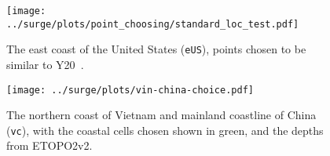 \begin{figure}[htb!]
\centering
\texttt{[image: ../surge/plots/point\_choosing/standard\_loc\_test.pdf]}

\vspace{-15pt}

\caption{The east coast of the United States (\texttt{eUS}), points chosen to be similar to
Y20~\cite{ZannaPreprint}.}
\label{fig:america}


\texttt{[image: ../surge/plots/vin-china-choice.pdf]}

\vspace{-11pt}

\caption{The northern coast of Vietnam
and mainland coastline of China (\texttt{vc}),
with the coastal cells chosen shown in green,
and the depths from ETOPO2v2.}
\label{fig:vin-china}
\end{figure}
